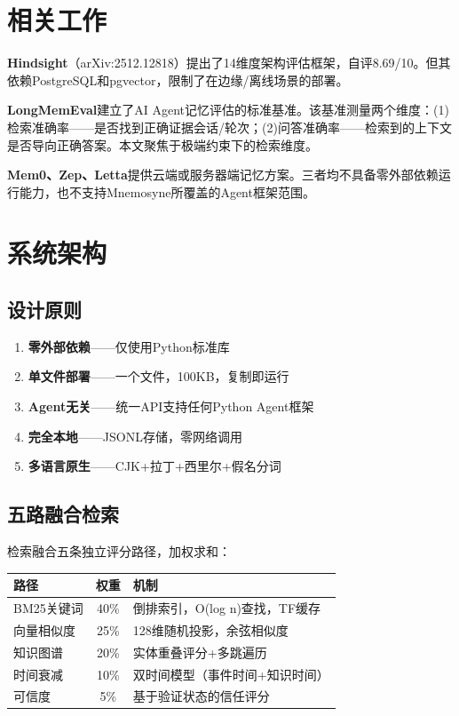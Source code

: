 \documentclass[11pt,a4paper]{ctexart}
\begin{document}
\section{相关工作}

\textbf{Hindsight}（arXiv:2512.12818）提出了14维度架构评估框架，自评8.69/10。但其依赖PostgreSQL和pgvector，限制了在边缘/离线场景的部署。

\textbf{LongMemEval}建立了AI Agent记忆评估的标准基准。该基准测量两个维度：(1)检索准确率——是否找到正确证据会话/轮次；(2)问答准确率——检索到的上下文是否导向正确答案。本文聚焦于极端约束下的检索维度。

\textbf{Mem0、Zep、Letta}提供云端或服务器端记忆方案。三者均不具备零外部依赖运行能力，也不支持Mnemosyne所覆盖的Agent框架范围。

\section{系统架构}

\subsection{设计原则}

\begin{enumerate}
    \item \textbf{零外部依赖}——仅使用Python标准库
    \item \textbf{单文件部署}——一个文件，100KB，复制即运行
    \item \textbf{Agent无关}——统一API支持任何Python Agent框架
    \item \textbf{完全本地}——JSONL存储，零网络调用
    \item \textbf{多语言原生}——CJK+拉丁+西里尔+假名分词
\end{enumerate}

\subsection{五路融合检索}

检索融合五条独立评分路径，加权求和：

\begin{table}[h]
\centering
\begin{tabular}{lcl}
\toprule
\textbf{路径} & \textbf{权重} & \textbf{机制} \\
\midrule
BM25关键词 & 40\% & 倒排索引，O(log n)查找，TF缓存 \\
向量相似度 & 25\% & 128维随机投影，余弦相似度 \\
知识图谱 & 20\% & 实体重叠评分+多跳遍历 \\
时间衰减 & 10\% & 双时间模型（事件时间+知识时间） \\
可信度 & 5\% & 基于验证状态的信任评分 \\
\bottomrule
\end{tabular}
\end{table}
\end{document}
